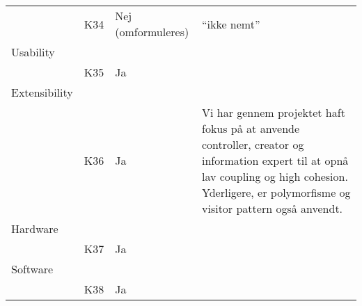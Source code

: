 \documentclass[class=article, crop=false]{standalone}
\begin{document}
\begin{table}[]
\begin{tabular}{llll}
            & K34      & Nej (omformuleres) & “ikke nemt”                                                                                                                                                                                        \\
            Usability       &          &                    &                                                                                                                                                                                                    \\
            & K35      & Ja                 &                                                                                                                                                                                                    \\
            Extensibility   &          &                    &                                                                                                                                                                                                    \\
            & K36      & Ja                 & Vi har gennem projektet haft fokus på at anvende controller, creator og information expert til at opnå lav coupling og high cohesion. Yderligere, er polymorfisme og visitor pattern også anvendt. \\
            Hardware        &          &                    &                                                                                                                                                                                                    \\
            & K37      & Ja                 &                                                                                                                                                                                                    \\
            Software        &          &                    &                                                                                                                                                                                                    \\
            & K38      & Ja                 &
        \end{tabular}
    \end{table}
\end{document}
